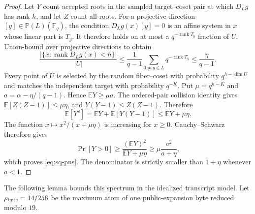 \documentclass[11pt]{article}
\newcommand{\F}{\mathbb F}
\newcommand{\rank}{\operatorname{rank}}
\begin{document}
\begin{proof}
Let $Y$ count accepted roots in the sampled target--coset pair at which
$D_Lg$ has rank $h$, and let $Z$ count all roots.  For a projective direction
$[y]\in\mathbb P(L)(\F_q)$, the condition $D_Lg(x)[y]=0$ is an affine system
in $x$ whose linear part is $T_y$.  It therefore holds on at most a
$q^{-\rank T_y}$ fraction of $U$.  Union-bound over projective directions to
obtain
\[
 \frac{|\{x:\rank D_Lg(x)<h\}|}{|U|}
 \le \frac1{q-1}\sum_{0\ne y\in L}q^{-\rank T_y}
 \le \frac\eta{q-1}.
\]
Every point of $U$ is selected by the random fiber--coset with probability
$q^{h-\dim U}$ and matches the independent target with probability $q^{-K}$.
Put $\mu=q^{h-K}$ and $a=\alpha-\eta/(q-1)$.  Hence
$\mathbb EY\ge\mu a$.
The ordered-pair collision identity gives
$\mathbb E[Z(Z-1)]\le\mu\eta$, and
$Y(Y-1)\le Z(Z-1)$.  Therefore
\[
 \mathbb E[Y^2]
 =\mathbb EY+\mathbb E[Y(Y-1)]
 \le \mathbb EY+\mu\eta.
\]
The function $x\mapsto x^2/(x+\mu\eta)$ is increasing for $x\ge0$.
Cauchy--Schwarz therefore gives
\[
 \Pr[Y>0]\ge
 \frac{(\mathbb EY)^2}{\mathbb EY+\mu\eta}
 \ge \mu\frac{a^2}{a+\eta},
\]
which proves \eqref{eq:sq-pns}.  The denominator is strictly smaller than
$1+\eta$ whenever $a<1$.
\end{proof}

The following lemma bounds this spectrum in the idealized transcript model.
Let $\rho_{\rm byte}=14/256$ be the maximum atom of one public-expansion byte
reduced modulo $19$.
\end{document}
